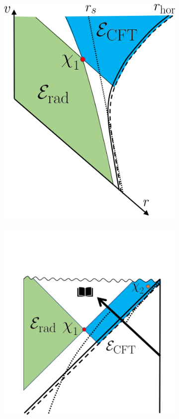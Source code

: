 \documentclass[12pt]{article}
\begin{document}
\begin{figure}[t]
\begin{subfigure}{.48\textwidth}
  \centering
 \includegraphics[width = 0.65\linewidth]{BH_Eddington_LargeDiary.png}
\end{subfigure}
\begin{subfigure}{.48\textwidth}
  \centering
  \vspace{-2cm}
 \includegraphics[width = 0.9\linewidth]{BH_Penrose_LargeDiary.png}

\end{subfigure}
\end{figure}
\end{document}
